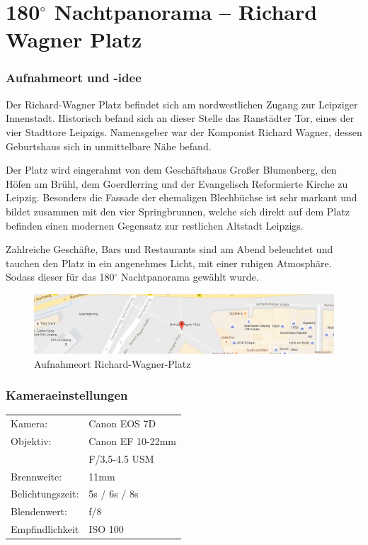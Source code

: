 \documentclass[liststotoc,bibtotoc,fontsize=14pt,]{scrreprt}
\begin{document}
	\section{180$^\circ$ Nachtpanorama -- Richard Wagner Platz}
	\label{sec:wagner}
	\subsubsection{Aufnahmeort und -idee}
	Der Richard-Wagner Platz befindet sich am nordwestlichen Zugang zur Leipziger Innenstadt. Historisch befand sich an dieser Stelle das Ranstädter Tor, eines der vier Stadttore Leipzigs. Namensgeber war der Komponist Richard Wagner, dessen Geburtshaus sich in unmittelbare Nähe befand.
	
	\bigskip
	Der Platz wird eingerahmt von dem Geschäftshaus \grqq{}Großer Blumenberg\grqq{}, den Höfen am Brühl, dem Goerdlerring und der Evangelisch Reformierte Kirche zu Leipzig. Besonders die Fassade der ehemaligen \grqq{}Blechbüchse\grqq{} ist sehr markant und bildet zusammen mit den vier Springbrunnen, welche sich direkt auf dem Platz befinden einen modernen Gegensatz zur restlichen Altstadt Leipzigs.
	
	\bigskip
	Zahlreiche Geschäfte, Bars und Restaurants sind am Abend beleuchtet und tauchen den Platz in ein angenehmes Licht, mit einer ruhigen  Atmosphäre. Sodass dieser für das 180$^\circ$ Nachtpanorama gewählt wurde.
	
	\begin{figure}[H]
		\includegraphics[width=\linewidth]{img/places/rw_map.jpg}
		\caption{Aufnahmeort Richard-Wagner-Platz}
		\label{img:rw_map}
	\end{figure}
	
	\subsubsection{Kameraeinstellungen}
	\begin{minipage}{0.58\textwidth}
	\begin{tabular}{ll}
		Kamera: &Canon EOS 7D \\
		Objektiv: &Canon EF 10-22mm \\
		& F/3.5-4.5 USM\\		
		Brennweite:& 11mm \\
		Belichtungszeit: & 5s / 6s / 8s\\
		Blendenwert: & f/8\\
		Empfindlichkeit & ISO 100 \\
	\end{tabular}\\
	\end{minipage}%
	\begin{minipage}{0.42\textwidth}

	\end{minipage}%
	
\end{document}

